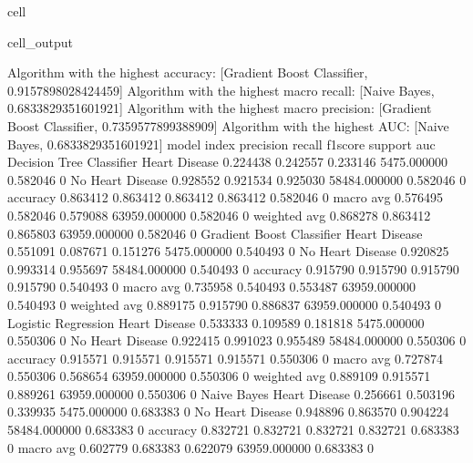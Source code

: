 \documentclass[letterpaper,10pt,english]{jupyterBook}
\begin{document}
\begin{sphinxuseclass}{cell}
\begin{sphinxVerbatimOutput}
\begin{sphinxuseclass}{cell_output}
\begin{sphinxVerbatim}[commandchars=\\\{\}]
Algorithm with the highest accuracy: [\PYGZsq{}Gradient Boost Classifier\PYGZsq{}, 0.9157898028424459]
Algorithm with the highest macro recall:
        [\PYGZsq{}Naive Bayes\PYGZsq{}, 0.6833829351601921]
Algorithm with the highest macro precision:
        [\PYGZsq{}Gradient Boost Classifier\PYGZsq{}, 0.7359577899388909]
Algorithm with the highest AUC:
        [\PYGZsq{}Naive Bayes\PYGZsq{}, 0.6833829351601921]
model                      index             precision  recall    f1\PYGZhy{}score  support       auc     
Decision Tree Classifier   Heart Disease     0.224438   0.242557  0.233146  5475.000000   0.582046    0
                           No Heart Disease  0.928552   0.921534  0.925030  58484.000000  0.582046    0
                           accuracy          0.863412   0.863412  0.863412  0.863412      0.582046    0
                           macro avg         0.576495   0.582046  0.579088  63959.000000  0.582046    0
                           weighted avg      0.868278   0.863412  0.865803  63959.000000  0.582046    0
Gradient Boost Classifier  Heart Disease     0.551091   0.087671  0.151276  5475.000000   0.540493    0
                           No Heart Disease  0.920825   0.993314  0.955697  58484.000000  0.540493    0
                           accuracy          0.915790   0.915790  0.915790  0.915790      0.540493    0
                           macro avg         0.735958   0.540493  0.553487  63959.000000  0.540493    0
                           weighted avg      0.889175   0.915790  0.886837  63959.000000  0.540493    0
Logistic Regression        Heart Disease     0.533333   0.109589  0.181818  5475.000000   0.550306    0
                           No Heart Disease  0.922415   0.991023  0.955489  58484.000000  0.550306    0
                           accuracy          0.915571   0.915571  0.915571  0.915571      0.550306    0
                           macro avg         0.727874   0.550306  0.568654  63959.000000  0.550306    0
                           weighted avg      0.889109   0.915571  0.889261  63959.000000  0.550306    0
Naive Bayes                Heart Disease     0.256661   0.503196  0.339935  5475.000000   0.683383    0
                           No Heart Disease  0.948896   0.863570  0.904224  58484.000000  0.683383    0
                           accuracy          0.832721   0.832721  0.832721  0.832721      0.683383    0
                           macro avg         0.602779   0.683383  0.622079  63959.000000  0.683383    0

\end{sphinxVerbatim}
\end{sphinxuseclass}
\end{sphinxVerbatimOutput}
\end{sphinxuseclass}
\end{document}
